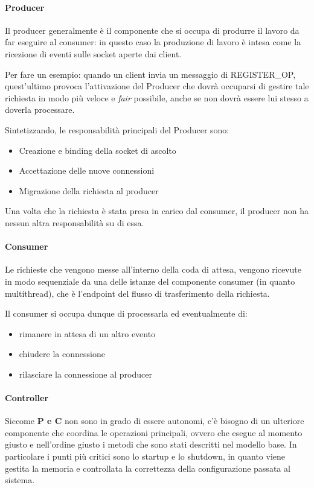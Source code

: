 \documentclass[]{article}
\begin{document}
\paragraph{Producer}
Il producer generalmente \`e il componente che si occupa di produrre il lavoro da far eseguire al
consumer: in questo caso la produzione di lavoro \`e intesa come la ricezione di eventi sulle socket
aperte dai client.

Per fare un esempio: quando un client invia un messaggio di REGISTER\_OP, quest'ultimo provoca
l'attivazione del Producer che dovr\`a occuparsi di gestire tale richiesta in modo pi\`u
veloce e \textit{fair} possibile, anche se non dovr\`a essere lui stesso a doverla
processare.

Sintetizzando, le responsabilit\`a principali del Producer sono:
\begin{itemize}
	\item Creazione e binding della socket di ascolto
	\item Accettazione delle nuove connessioni
	\item Migrazione della richiesta al producer
\end{itemize}

Una volta che la richiesta \`e stata presa in carico dal consumer,
il producer non ha nessun altra responsabilit\`a su di essa.

\paragraph{Consumer}
Le richieste che vengono messe all'interno della coda di attesa, vengono
ricevute in modo sequenziale da una delle istanze del componente consumer
(in quanto multithread), che \`e l'endpoint del flusso di trasferimento della richiesta.

Il consumer si occupa dunque di processarla ed eventualmente di:
\begin{itemize}
	\item rimanere in attesa di un altro evento
	\item chiudere la connessione
	\item rilasciare la connessione al producer
\end{itemize}

\paragraph{Controller}
Siccome \textbf{P e C} non sono in grado di essere
autonomi, c'\`e bisogno di un ulteriore componente che coordina
le operazioni principali, ovvero che esegue al momento giusto
e nell'ordine giusto i metodi che sono stati descritti
nel modello base. In particolare i punti pi\`u critici sono lo startup e lo 
shutdown, in quanto viene gestita la memoria e controllata
la correttezza della configurazione passata al sistema.
 
\end{document}
